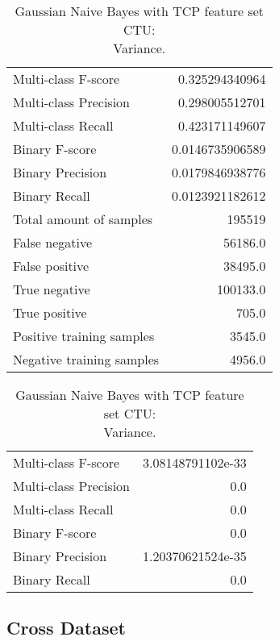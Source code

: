 \begin{table}[H]
\begin{minipage}{0.5\textwidth}
\caption{Gaussian Naive Bayes with TCP feature set CTU: \\Average.}
\centering
\begin{tabular}{l r}
\toprule
Multi-class F-score & 0.325294340964 \\
Multi-class Precision & 0.298005512701 \\
Multi-class Recall & 0.423171149607 \\
\midrule
Binary F-score & 0.0146735906589 \\
Binary Precision & 0.0179846938776 \\
Binary Recall & 0.0123921182612 \\
\midrule
Total amount of samples & 195519 \\
False negative & 56186.0 \\
False positive & 38495.0 \\
True negative & 100133.0 \\
True positive & 705.0 \\
\midrule
Positive training samples & 3545.0 \\
Negative training samples & 4956.0 \\
\bottomrule
\end{tabular}
\end{minipage}
\hfillx
\begin{minipage}{0.5\textwidth}
\caption{Gaussian Naive Bayes with TCP feature set CTU: \\Variance.}
\centering
\begin{tabular}{l r}
\toprule
Multi-class F-score & 3.08148791102e-33 \\
Multi-class Precision & 0.0 \\
Multi-class Recall & 0.0 \\
\midrule
Binary F-score & 0.0 \\
Binary Precision & 1.20370621524e-35 \\
Binary Recall & 0.0 \\
\bottomrule
\end{tabular}
\end{minipage}
\end{table}

\newpage
\subsection{Cross Dataset}

